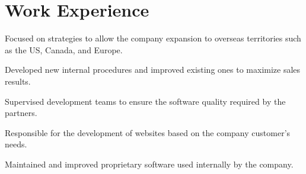 \documentclass[]{deedy-resume-openfont}
\begin{document}
%
%


%
%

%
%

\begin{minipage}[t]{0.49\textwidth} 


\section{Work Experience}
\vspace{\topsep} %
\begin{tightemize}
\item Focused on strategies to allow the company expansion to overseas territories such as the US, Canada, and Europe.
\item Developed new internal procedures and improved existing ones to maximize sales results.
\item Supervised development teams to ensure the software quality required by the partners.
\end{tightemize}
\sectionsep

\begin{tightemize}
\item Responsible for the development of websites based on the company customer's needs.
\item Maintained and improved proprietary software used internally by the company.
\end{tightemize}
\sectionsep



\end{minipage}
\end{document}
